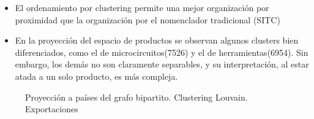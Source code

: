 \documentclass[compress]{beamer}
\begin{document}
\begin{frame}

\begin{itemize}[label=\faRebel]
	\item El ordenamiento por clustering permite una mejor organización por proximidad que la organización por el nomenclador tradicional (SITC\citep{WTO2017})
	\item En la proyección del espacio de productos se observan algunos clusters bien diferenciados, como el de microcircuitos(7526) y el de herramientas(6954). Sin embargo, los demás no son claramente separables, y su interpretación, al estar atada a un solo producto, es más compleja.
	
\end{itemize}
\end{frame}


\begin{frame}
	\begin{figure}
		\centering
		\caption{Proyección a países del grafo bipartito. Clustering Louvain. Exportaciones}
		\label{fig:mapas_proyeccion_louvain}
	\end{figure}
\end{frame}
\end{document}

